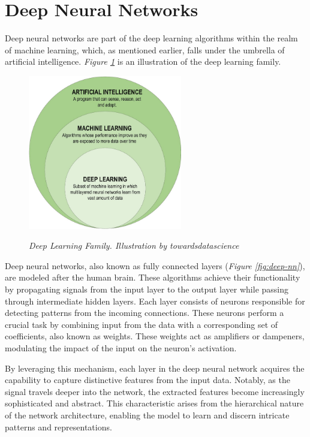\section{Deep Neural Networks}

Deep neural networks are part of the deep learning algorithms within the realm
of machine learning, which, as mentioned earlier, falls under the umbrella of
artificial intelligence. \textit{Figure \ref{fig:deep-learning-family}} is an
illustration of the deep learning family. \newline

\begin{figure}[H]
  \centering
  \includegraphics[width=0.6\textwidth]{imatges/preliminaries/deep-learning-familiy.png}
  \caption[Deep Learning Family]{\textit{Deep Learning Family. Illustration by towardsdatascience}}
  {\label{fig:deep-learning-family}}
\end{figure}

Deep neural networks, also known as fully connected layers (\textit{Figure \ref{fig:deep-nn}}), are modeled after
the human brain. These algorithms achieve their functionality by propagating
signals from the input layer to the output layer while passing through
intermediate hidden layers. Each layer consists of neurons responsible for
detecting patterns from the incoming connections. These neurons perform a
crucial task by combining input from the data with a corresponding set of
coefficients, also known as weights. These weights act as amplifiers or
dampeners, modulating the impact of the input on the neuron's activation.
\newline

By leveraging this mechanism, each layer in the deep neural network acquires
the capability to capture distinctive features from the input data. Notably, as
the signal travels deeper into the network, the extracted features become
increasingly sophisticated and abstract. This characteristic arises from the
hierarchical nature of the network architecture, enabling the model to learn
and discern intricate patterns and representations. \newline

